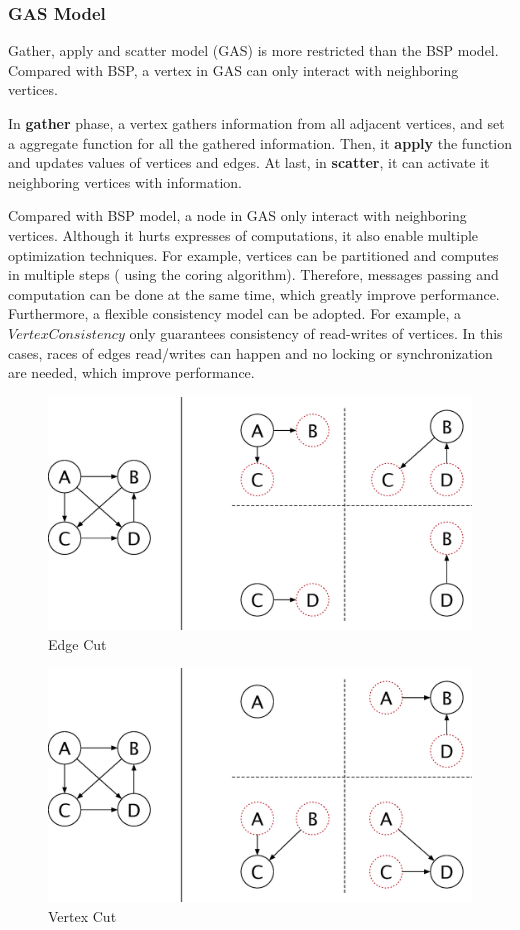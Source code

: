 \subsubsection{GAS Model}
Gather, apply and scatter model (GAS) is more restricted than the BSP model.
Compared with BSP, a vertex in GAS can only interact with neighboring
vertices.

In \textbf{gather} phase, a vertex gathers information from all adjacent vertices, and
set a aggregate function for all the gathered information. Then, it \textbf{apply}
the function and updates values of vertices and edges. At last, in \textbf{scatter},
it can activate it neighboring vertices with information.

Compared with BSP model, a node in GAS only interact with neighboring
vertices. Although it hurts expresses of computations, it also
enable multiple optimization techniques. For example, vertices can
be partitioned and computes in multiple steps (\eg{} using the coring
algorithm). Therefore,
messages passing and computation can be done at the same time, which
greatly improve performance.
Furthermore, a flexible consistency model can be adopted. For example,
a $Vertex Consistency$ only guarantees consistency of read-writes
of vertices. In this cases, races of edges read/writes can happen
and no locking or synchronization are needed, which improve performance.


\begin{figure}
  \center
  \includegraphics[width=.8\linewidth]{figures/edgecut}
  \caption{Edge Cut}
  \label{fig:edgecut}
\end{figure}

\begin{figure}
  \center
  \includegraphics[width=.8\linewidth]{figures/vertexcut}
  \caption{Vertex Cut}
  \label{fig:vertexcut}
\end{figure}

